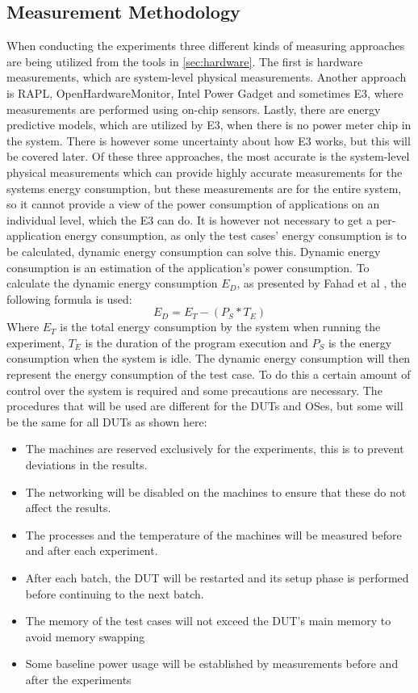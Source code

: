 \subsection{Measurement Methodology}
When conducting the experiments three different kinds of measuring approaches are being utilized from the tools in \cref{sec:hardware}.
The first is hardware measurements, which are system-level physical measurements. Another approach is RAPL, OpenHardwareMonitor, Intel Power Gadget and sometimes E3, where measurements are performed using on-chip sensors. Lastly, there are energy predictive models, which are utilized by E3, when there is no power meter chip in the system. There is however some uncertainty about how E3 works, but this will be covered later. Of these three approaches, the most accurate is the system-level physical measurements which can provide highly accurate measurements for the systems energy consumption, but these measurements are for the entire system, so it cannot provide a view of the power consumption of applications on an individual level, which the E3 can do. It is however not necessary to get a per-application energy consumption, as only the test cases' energy consumption is to be calculated, dynamic energy consumption can solve this. Dynamic energy consumption is an estimation of the application's power consumption. To calculate the dynamic energy consumption $E_D$, as presented by Fahad et al \cite{fahad2019comparative}, the following formula is used:
$$E_D = E_T -(P_S * T_E)$$
Where $E_T$ is the total energy consumption by the system when running the experiment, $T_E$ is the duration of the program execution and $P_S$ is the energy consumption when the system is idle. The dynamic energy consumption will then represent the energy consumption of the test case. To do this a certain amount of control over the system is required and some precautions are necessary. The procedures that will be used are different for the DUTs and OSes, but some will be the same for all DUTs as shown here:\cite*{fahad2019comparative}

\begin{itemize}
    \item The machines are reserved exclusively for the experiments, this is to prevent deviations in the results.
    \item The networking will be disabled on the machines to ensure that these do not affect the results.
    \item The processes and the temperature of the machines will be measured before and after each experiment.
    \item After each batch, the DUT will be restarted and its setup phase is performed before continuing to the next batch.
    \item The memory of the test cases will not exceed the DUT's main memory to avoid memory swapping
    \item Some baseline power usage will be established by measurements before and after the experiments
\end{itemize}

